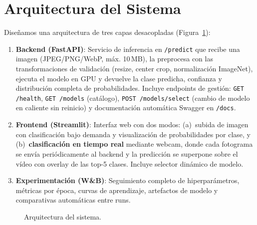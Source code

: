 \documentclass[10pt,a4paper,twocolumn]{article}
\begin{document}
\section{Arquitectura del Sistema}

Diseñamos una arquitectura de tres capas desacopladas (Figura~\ref{fig:arch}):

\begin{enumerate}
    \item \textbf{Backend (FastAPI)}: Servicio de inferencia en \texttt{/predict} que recibe una imagen (JPEG/PNG/WebP, máx. 10\,MB), la preprocesa con las transformaciones de validación (resize, center crop, normalización ImageNet), ejecuta el modelo en GPU y devuelve la clase predicha, confianza y distribución completa de probabilidades. Incluye endpoints de gestión: \texttt{GET /health}, \texttt{GET /models} (catálogo), \texttt{POST /models/select} (cambio de modelo en caliente sin reinicio) y documentación automática Swagger en \texttt{/docs}.
    \item \textbf{Frontend (Streamlit)}: Interfaz web con dos modos: (a)~subida de imagen con clasificación bajo demanda y visualización de probabilidades por clase, y (b)~\textbf{clasificación en tiempo real} mediante webcam, donde cada fotograma se envía periódicamente al backend y la predicción se superpone sobre el vídeo con overlay de las top-5 clases. Incluye selector dinámico de modelo.
    \item \textbf{Experimentación (W\&B)}: Seguimiento completo de hiperparámetros, métricas por época, curvas de aprendizaje, artefactos de modelo y comparativas automáticas entre runs.
\end{enumerate}

\begin{figure}[H]
\centering
\small
{}
\caption{Arquitectura del sistema.}
\label{fig:arch}
\end{figure}
\end{document}

